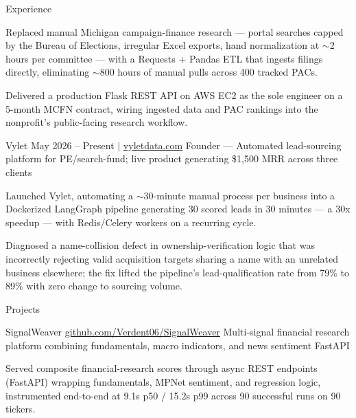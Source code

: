 \documentclass[
	11pt
]{../../../template}
\begin{document}
\begin{rSection}{E}{xperience}
\begin{rSectionEntry}
			\item Replaced manual Michigan campaign-finance research --- portal searches capped by the Bureau of Elections, irregular Excel exports, hand normalization at $\sim$2 hours per committee --- with a Requests + Pandas ETL that ingests filings directly, eliminating $\sim$800 hours of manual pulls across 400 tracked PACs.
			\item Delivered a production Flask REST API on AWS EC2 as the sole engineer on a 5-month MCFN contract, wiring ingested data and PAC rankings into the nonprofit's public-facing research workflow.
		\end{rSectionEntry}

		\begin{rSectionEntry}
			{Vylet}
			{May 2026 -- Present $\vert$ \href{https://vyletdata.com}{vyletdata.com}}
			{Founder --- Automated lead-sourcing platform for PE/search-fund; live product generating \$1,500 MRR across three clients}
			{}
			{}

			\item Launched Vylet, automating a $\sim$30-minute manual process per business into a Dockerized LangGraph pipeline generating 30 scored leads in 30 minutes --- a 30x speedup --- with Redis/Celery workers on a recurring cycle.
			\item Diagnosed a name-collision defect in ownership-verification logic that was incorrectly rejecting valid acquisition targets sharing a name with an unrelated business elsewhere; the fix lifted the pipeline's lead-qualification rate from 79\% to 89\% with zero change to sourcing volume.
		\end{rSectionEntry}
	\end{rSection}

	\begin{rSection}{P}{rojects}
		\begin{rSectionEntry}
			{SignalWeaver}
			{\href{https://github.com/Verdent06/SignalWeaver}{github.com/Verdent06/SignalWeaver}}
			{Multi-signal financial research platform combining fundamentals, macro indicators, and news sentiment}
			{FastAPI}
			{}

			\item Served composite financial-research scores through async REST endpoints (FastAPI) wrapping fundamentals, MPNet sentiment, and regression logic, instrumented end-to-end at 9.1s p50 / 15.2s p99 across 90 successful runs on 90 tickers.
		\end{rSectionEntry}
	\end{rSection}
\end{document}

